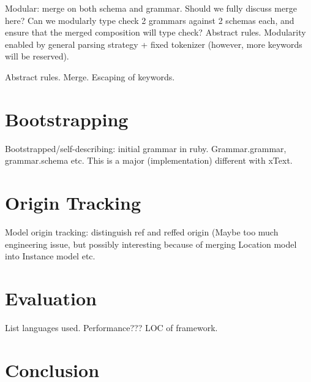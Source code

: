 \documentclass[a4paper]{article}
\begin{document}
Modular: merge on both schema and grammar. Should we fully discuss
merge here? Can we modularly type check 2 grammars against 2 schemas
each, and ensure that the merged composition will type check? Abstract
rules. Modularity enabled by general parsing strategy + fixed
tokenizer (however, more keywords will be reserved).

Abstract rules. Merge. Escaping of keywords.


\section{Bootstrapping}

Bootstrapped/self-describing: initial grammar in
ruby. Grammar.grammar, grammar.schema etc. This is a major
(implementation) different with xText.

\section{Origin Tracking}

Model origin tracking: distinguish ref and reffed origin (Maybe too
much engineering issue, but possibly interesting because of merging
Location model into Instance model etc.

\section{Evaluation}

List languages used. Performance??? LOC of framework.


\section{Conclusion}
\end{document}
